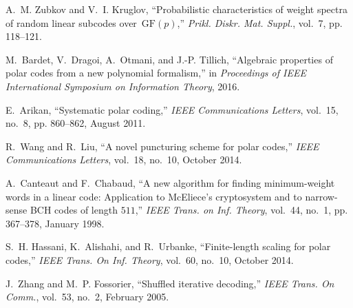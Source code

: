 \documentclass[conference]{IEEEtran}
\theoremstyle{plain}
\begin{document}
\begin{thebibliography}{10}
A.~M. Zubkov and V.~I. Kruglov, ``Probabilistic characteristics of weight
  spectra of random linear subcodes over~$\mathrm{GF}(p)$,'' \emph{Prikl.
  Diskr. Mat. Suppl.}, vol.~7, pp. 118--121.

M.~Bardet, V.~Dragoi, A.~Otmani, and J.-P. Tillich, ``Algebraic properties of
  polar codes from a new polynomial formalism,'' in \emph{Proceedings of IEEE
  International Symposium on Information Theory}, 2016.

E.~Arikan, ``Systematic polar coding,'' \emph{IEEE Communications Letters},
  vol.~15, no.~8, pp. 860--862, August 2011.

R.~Wang and R.~Liu, ``A novel puncturing scheme for polar codes,'' \emph{IEEE
  Communications Letters}, vol.~18, no.~10, October 2014.

A.~Canteaut and F.~Chabaud, ``A new algorithm for finding minimum-weight words
  in a linear code: Application to {McEliece's} cryptosystem and to
  narrow-sense {BCH} codes of length $511$,'' \emph{IEEE Trans. on
  Inf. Theory}, vol.~44, no.~1, pp. 367--378, January 1998.

S.~H. Hassani, K.~Alishahi, and R.~Urbanke, ``Finite-length scaling for polar
  codes,'' \emph{IEEE Trans. On Inf. Theory}, vol.~60, no.~10,
  October 2014.

J.~Zhang and M.~P. Fossorier, ``Shuffled iterative decoding,'' \emph{IEEE
  Trans. On Comm.}, vol.~53, no.~2, February 2005.

\end{thebibliography}
\end{document}
